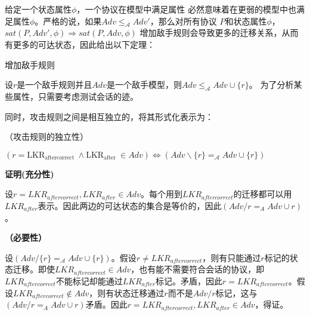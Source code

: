 给定一个状态属性$\phi$，一个协议在模型中满足属性 必然意味着在更弱的模型中也满足属性$\phi$。严格的说，如果$Adv{{\le }_{\mathcal{A}}}Adv'$，那么对所有协议 $P$和状态属性$\phi$，$sat\left( P,Adv',\phi  \right)\Rightarrow sat\left( P,Adv,\phi  \right)$
增加敌手规则会导致更多的迁移关系，从而有更多的可达状态，因此给出以下定理：
\begin{theorm}{增加敌手规则}

设$r$是一个敌手规则并且$Adv$是一个敌手模型，则$Adv{{\le }_{\mathcal{A}}}Adv\cup \{r\}$。
为了分析某些属性，只需要考虑测试会话的迹。
\end{theorm}

同时，攻击规则之间是相互独立的，将其形式化表示为：

\begin{theorm}{（攻击规则的独立性）}

$\left(r=\mathrm{LKR}_{\text {aftercorrect }} \wedge \mathrm{LKR}_{\text {after }} \in A d v\right) \Leftrightarrow\left(A d v \backslash\{r\}=_{\mathcal{A}} A d v \cup\{r\}\right)$

\end{theorm}


\textbf{证明(充分性)} 

设$r = LKR_{aftercorrect},LKR_{after}\in Adv$。每个用到$LKR_{aftercorrect}$的迁移都可以用$LKR_{after}$表示。因此两边的可达状态的集合是等价的，因此$(Adv/{r}=_{A}Adv\cup {r})$ 。

\textbf{（必要性）}

设$(Adv/\{r\}=_{\mathcal{A}} A d v \cup\{r\})$。假设$r\neq LKR_{aftercorrect}$，则有只能通过$r$标记的状态迁移。即使$LKR_{aftercorrect}\in Adv$，也有能不需要符合会话的协议，即$LKR_{aftercorrect}$不能标记却能通过$LKR_{after}$标记。矛盾，因此$r=LKR_{aftercorrect}$。假设$LKR_{aftercorrect}\notin Adv$，则有状态迁移通过$r$而不是$Adv/{r}$标记，这与$(Adv/{r}=_{A}Adv\cup {r})$矛盾。因此$r = LKR_{aftercorrect},LKR_{after}\in Adv$，得证。


